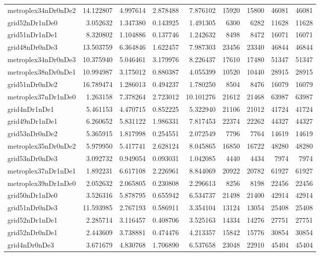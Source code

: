 \begin{longtable}{|l|r|r|r|r|r|r|r|r|}
metroplex34nDr0nDe2 & 14.122807 & 4.997614 & 2.878488 & 7.876102 & 15920 & 15800 & 46081 & 46081 \\
grid52nDr1nDe0 & 3.052632 & 1.347380 & 0.143925 & 1.491305 & 6300 & 6282 & 11628 & 11628 \\
grid51nDr1nDe1 & 8.320802 & 1.104886 & 0.137746 & 1.242632 & 8498 & 8472 & 16071 & 16071 \\
grid48nDr0nDe3 & 13.503759 & 6.364846 & 1.622457 & 7.987303 & 23456 & 23340 & 46844 & 46844 \\
metroplex34nDr0nDe3 & 10.375940 & 5.046461 & 3.179976 & 8.226437 & 17610 & 17480 & 51347 & 51347 \\
metroplex38nDr0nDe1 & 10.994987 & 3.175012 & 0.880387 & 4.055399 & 10520 & 10440 & 28915 & 28915 \\
grid51nDr0nDe2 & 16.789474 & 1.286013 & 0.494237 & 1.780250 & 8504 & 8476 & 16079 & 16079 \\
metroplex37nDr1nDe0 & 1.263158 & 7.378264 & 2.723012 & 10.101276 & 21612 & 21468 & 63987 & 63987 \\
grid4nDr1nDe1 & 5.461153 & 4.470715 & 0.852225 & 5.322940 & 21106 & 21012 & 41724 & 41724 \\
grid49nDr1nDe1 & 6.260652 & 5.831122 & 1.986331 & 7.817453 & 22374 & 22262 & 44327 & 44327 \\
grid53nDr0nDe2 & 5.365915 & 1.817998 & 0.254551 & 2.072549 & 7796 & 7764 & 14619 & 14619 \\
metroplex35nDr0nDe2 & 5.979950 & 5.417741 & 2.628124 & 8.045865 & 16850 & 16722 & 48280 & 48280 \\
grid53nDr0nDe3 & 3.092732 & 0.949054 & 0.093031 & 1.042085 & 4440 & 4434 & 7974 & 7974 \\
metroplex37nDr1nDe1 & 1.892231 & 6.617108 & 2.226961 & 8.844069 & 20922 & 20782 & 61927 & 61927 \\
metroplex39nDr1nDe0 & 2.052632 & 2.065805 & 0.230808 & 2.296613 & 8256 & 8198 & 22456 & 22456 \\
grid50nDr1nDe0 & 3.526316 & 5.878795 & 0.655942 & 6.534737 & 21498 & 21400 & 42914 & 42914 \\
grid51nDr0nDe3 & 11.593985 & 2.767193 & 0.586911 & 3.354104 & 13124 & 13054 & 25408 & 25408 \\
grid52nDr1nDe1 & 2.285714 & 3.116457 & 0.408706 & 3.525163 & 14334 & 14276 & 27751 & 27751 \\
grid52nDr0nDe1 & 2.443609 & 3.738881 & 0.474476 & 4.213357 & 15842 & 15776 & 30854 & 30854 \\
grid4nDr0nDe3 & 3.671679 & 4.830768 & 1.706890 & 6.537658 & 23048 & 22910 & 45404 & 45404 \\

\end{longtable}
